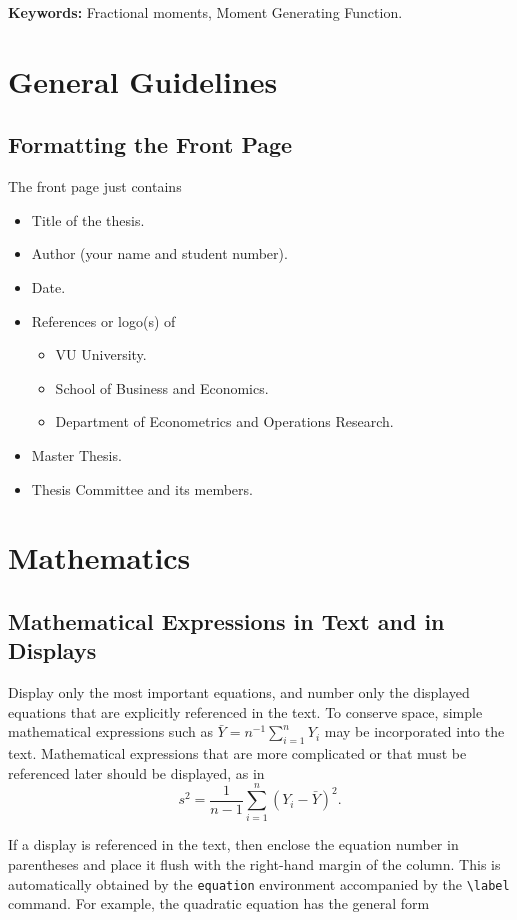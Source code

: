 \documentclass[a4paper,11pt]{article}
\theoremstyle{plain}
\theoremstyle{definition}
\begin{document}
\bigskip\noindent
\textbf{Keywords:} Fractional moments, Moment Generating Function.




\section{General Guidelines}\label{s:general}



\subsection{Formatting the Front Page}
The front page just contains
\begin{itemize}
\setlength\itemsep{-1mm}
\item
Title of the thesis.
\item
Author (your name and student number).
\item
Date.
\item
References or logo(s) of
\begin{itemize}
\item
VU University.
\item
School of Business and Economics.
\item
Department of Econometrics and Operations Research.
\end{itemize}
\item
Master Thesis.
\item
Thesis Committee and its members.
\end{itemize}


\section{Mathematics}
\subsection{Mathematical Expressions in Text and in Displays}
Display only the most important equations, and number only the
displayed equations that are explicitly referenced in the text.
To conserve space, simple mathematical expressions such as
$\bar Y = n^{-1} \sum_{i=1}^n Y_i$ may be incorporated into the text.
Mathematical expressions that are more complicated or that must be
referenced later should be displayed, as in
\[
s^2 = \frac 1 {n-1} \sum_{i=1}^n (Y_i - \bar Y)^2.
\]

If a display is referenced in the text, then enclose the equation number
in parentheses and place it flush with the right-hand margin of the
column. This is automatically obtained by the \texttt{equation} environment
accompanied by the \verb+\label+ command.
For example, the quadratic equation has the general form
\end{document}
